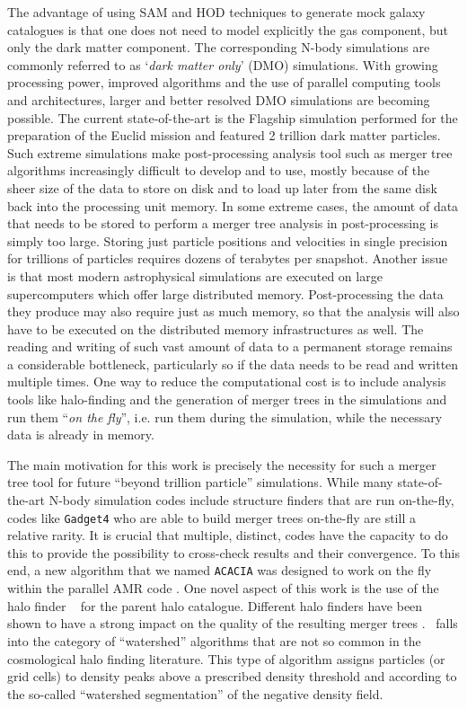 The advantage of using SAM and HOD techniques to generate mock galaxy
catalogues is that one does not need to model explicitly the gas
component, but only the dark matter component.  The corresponding
N-body simulations are commonly referred to as `\emph{dark matter
only}' (DMO) simulations.  With growing processing power, improved
algorithms and the use of parallel computing tools and architectures,
larger and better resolved DMO simulations are becoming possible.  The
current state-of-the-art is the Flagship simulation performed for the
preparation of the Euclid mission \citep{PKDGRAV} and featured 2
trillion dark matter particles.  Such extreme simulations make
post-processing analysis tool such as merger tree algorithms
increasingly difficult to develop and to use, mostly because of the
sheer size of the data to store on disk and to load up later from the
same disk back into the processing unit memory.  In some extreme
cases, the amount of data that needs to be stored to perform a merger
tree analysis in post-processing is simply too large.  Storing just
particle positions and velocities in single precision for trillions of
particles requires dozens of terabytes per snapshot.  Another issue is
that most modern astrophysical simulations are executed on large
supercomputers which offer large distributed memory.  Post-processing
the data they produce may also require just as much memory, so that
the analysis will also have to be executed on the distributed memory
infrastructures as well.  The reading and writing of such vast amount
of data to a permanent storage remains a considerable bottleneck,
particularly so if the data needs to be read and written multiple
times.  One way to reduce the computational cost is to include
analysis tools like halo-finding and the generation of merger trees in
the simulations and run them ``\textit{on the fly}'', i.e. run them
during the simulation, while the necessary data is already in memory.

The main motivation for this work is precisely the necessity for such
a merger tree tool for future ``beyond trillion particle''
simulations. While many state-of-the-art N-body simulation codes include
structure finders that are run on-the-fly, codes like \texttt{Gadget4}
\cite{springelSimulatingCosmicStructure2021a} who are able to build
merger trees on-the-fly are still a relative rarity. It is crucial that
multiple, distinct, codes have the capacity to do this to provide the
possibility to cross-check results and their convergence.
To this end, a new algorithm that we named
\texttt{ACACIA} was designed to work on the fly within the parallel
AMR code \ramses.  One novel aspect of this work is the use of the
halo finder \phew\ \citep{PHEW} for the parent halo catalogue.
Different halo finders have been shown to have a strong impact on the
quality of the resulting merger trees \citep{SUSSING_HALOFINDER}.
\phew\ falls into the category of ``watershed'' algorithms that are
not so common in the cosmological halo finding literature.  This type
of algorithm assigns particles (or grid cells) to density peaks above
a prescribed density threshold and according to the so-called
``watershed segmentation'' of the negative density field.

